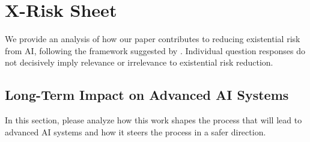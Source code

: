 \section{X-Risk Sheet}
We provide an analysis of how our paper contributes to reducing existential risk from AI, following the framework suggested by \citet{Hendrycks2022XRiskAF}. Individual question responses do not decisively imply relevance or irrelevance to existential risk reduction.

\subsection{Long-Term Impact on Advanced AI Systems}
In this section, please analyze how this work shapes the process that will lead to advanced AI systems and how it steers the process in a safer direction.


